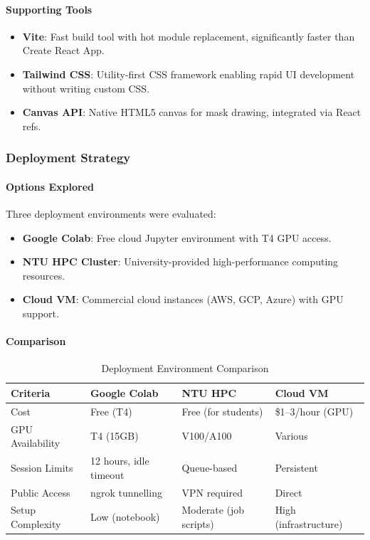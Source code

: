 \documentclass[12pt,a4paper]{report}
\begin{document}
\paragraph{Supporting Tools}
\begin{itemize}
    \item \textbf{Vite}: Fast build tool with hot module replacement, significantly faster than Create React App.
    \item \textbf{Tailwind CSS}: Utility-first CSS framework enabling rapid UI development without writing custom CSS.
    \item \textbf{Canvas API}: Native HTML5 canvas for mask drawing, integrated via React refs.
\end{itemize}

\subsubsection{Deployment Strategy}

\paragraph{Options Explored}

Three deployment environments were evaluated:
\begin{itemize}
    \item \textbf{Google Colab}: Free cloud Jupyter environment with T4 GPU access.
    \item \textbf{NTU HPC Cluster}: University-provided high-performance computing resources.
    \item \textbf{Cloud VM}: Commercial cloud instances (AWS, GCP, Azure) with GPU support.
\end{itemize}

\paragraph{Comparison}

\begin{table}[H]
\centering
\caption{Deployment Environment Comparison}
\label{tab:deployment}
\small
\renewcommand{\arraystretch}{1.3}
\begin{tabular}{|p{2.8cm}|p{3.2cm}|p{3.2cm}|p{3.5cm}|}
\hline
\textbf{Criteria} & \textbf{Google Colab} & \textbf{NTU HPC} & \textbf{Cloud VM} \\
\hline
Cost & Free (T4) & Free (for students) & \$1--3/hour (GPU) \\
\hline
GPU Availability & T4 (15GB) & V100/A100 & Various \\
\hline
Session Limits & 12 hours, idle timeout & Queue-based & Persistent \\
\hline
Public Access & ngrok tunnelling & VPN required & Direct \\
\hline
Setup Complexity & Low (notebook) & Moderate (job scripts) & High (infrastructure) \\
\hline
\end{tabular}
\end{table}
\end{document}
